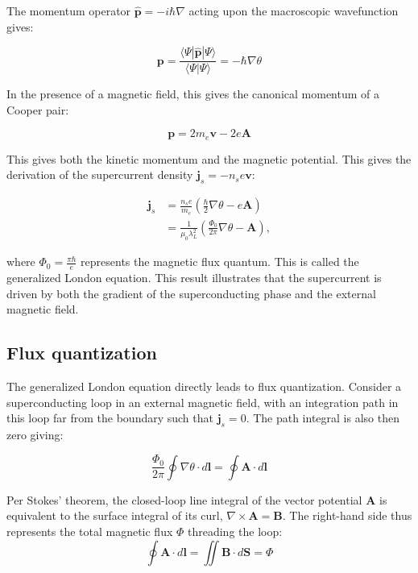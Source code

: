 The momentum operator $\hat{\mathbf{p}} = -i\hbar\nabla$ acting upon the macroscopic wavefunction gives:

\begin{equation}
    \mathbf{p} = \frac{\langle \Psi | \hat{\mathbf{p}} | \Psi \rangle}{\langle \Psi | \Psi \rangle} = -\hbar \nabla \theta
\end{equation}

In the presence of a magnetic field, this gives the canonical momentum of a Cooper pair:

\begin{equation}
    \mathbf{p} = 2m_e \mathbf{v} - 2e \mathbf{A} \tag{3.19}
\end{equation}

This gives both the kinetic momentum and the magnetic potential. This gives the derivation of the supercurrent density $\mathbf{j}_s = -n_s e \mathbf{v}$:

\begin{align}
    \mathbf{j}_s &= \frac{n_s e}{m_e} \left( \frac{\hbar}{2} \nabla \theta - e \mathbf{A} \right) \\
    &= \frac{1}{\mu_0 \lambda_L^2} \left( \frac{\Phi_0}{2\pi} \nabla \theta - \mathbf{A} \right),
\end{align}

where $\Phi_0 = \frac{\pi\hbar}{e}$ represents the magnetic flux quantum. This is called the generalized London equation. This result illustrates that the supercurrent is driven by both the gradient of the superconducting phase and the external magnetic field.

\subsection*{Flux quantization}

The generalized London equation directly leads to flux quantization. Consider a superconducting loop in an external magnetic field, with an integration path in this loop far from the boundary such that $\mathbf{j}_s = 0$. The path integral is also then zero giving:

\begin{equation}
    \frac{\Phi_0}{2\pi} \oint \nabla \theta \cdot d\mathbf{l} = \oint \mathbf{A} \cdot d\mathbf{l}
\end{equation}

Per Stokes' theorem, the closed-loop line integral of the vector potential $\mathbf{A}$ is equivalent to the surface integral of its curl, $\nabla \times \mathbf{A} = \mathbf{B}$. The right-hand side thus represents the total magnetic flux $\Phi$ threading the loop:
\begin{equation}
    \oint \mathbf{A} \cdot d\mathbf{l} = \iint \mathbf{B} \cdot d\mathbf{S} = \Phi
\end{equation}

